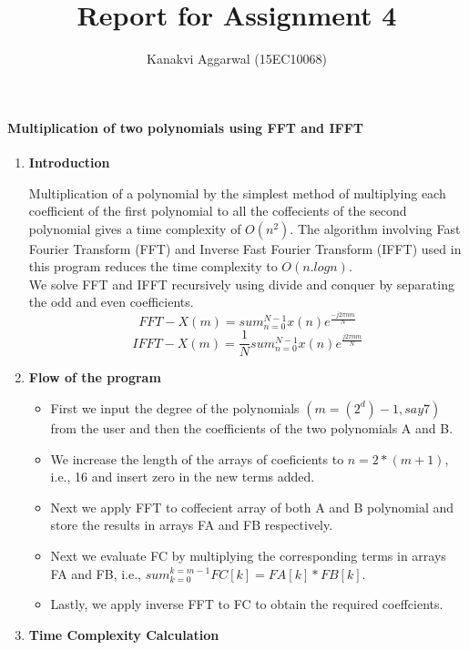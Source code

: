 \documentclass[a4paper,11pt]{article}
\title{Report for Assignment 4}
\author{Kanakvi Aggarwal (15EC10068)}
\begin{document}
\maketitle

\paragraph{Multiplication of two polynomials using FFT and IFFT}
\begin{enumerate}
 \item \textbf{Introduction}

Multiplication of a polynomial by the simplest method of multiplying each coefficient of the first polynomial to all the coffecients of the second polynomial gives a time complexity of $O(n^2)$.
The algorithm involving Fast Fourier Transform (FFT) and Inverse Fast Fourier Transform (IFFT) used in this program reduces the time complexity to $O(n.logn)$.\\
We solve FFT and IFFT recursively using divide and conquer by separating the odd and even coefficients.
\begin{displaymath} 
    FFT - X(m) = sum_{n=0}^{N-1} x(n)e^{\frac{-j2\pi nm}{N}}
\end{displaymath}
\begin{displaymath} 
    IFFT - X(m) = \frac{1}{N} sum_{n=0}^{N-1} x(n)e^{\frac{j2\pi nm}{N}}
\end{displaymath}

 \item \textbf{Flow of the program}
\begin{itemize}
\item First we input the degree of the polynomials $(m=(2^d)-1, say 7)$ from the user and then the coefficients of the two polynomials A and B.
\item We increase the length of the arrays of coeficients to $n=2*(m+1)$, i.e., 16 and insert zero in the new terms added.
\item Next we apply FFT to coffecient array of both A and B polynomial and store the results in arrays FA and FB respectively. 
\item Next we evaluate FC by multiplying the corresponding terms in arrays FA and FB, i.e., $sum_{k=0}^{k=m-1} FC[k]=FA[k]*FB[k].$
\item Lastly, we apply inverse FFT to FC to obtain the required coeffcients. 
 \end{itemize}
\item \textbf{Time Complexity Calculation}


\end{enumerate}
\end{document}
